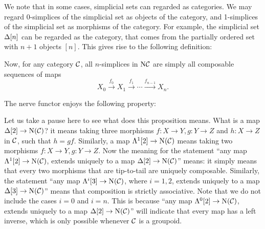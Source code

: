 We note that in some cases, simplicial sets can regarded as categories. We may regard 0-simplices of the simplicial set as objects of the category,
and 1-simplices of the simplicial set as morphisms of the category. For example, the simplicial set $\Delta[n]$ can be regarded as the category, 
that comes from the partially ordered set with $n+1$ objects $[n]$. This gives rise to the following definition:


Now, for any category $\mathcal{C}$, all $n$-simplices in $\mathrm{N}\mathcal{C}$ are simply all composable sequences of maps 
$$X_0\xrightarrow{f_0}X_1\xrightarrow{f_1}\cdots\xrightarrow{f_{n-1}}X_n.$$

The nerve functor enjoys the following property:


Let us take a pause here to see what does this proposition means. What is a map $\Delta[2]\to \mathrm{N}(\mathcal{C})$? it means taking three morphisms
$f:X\to Y,g:Y\to Z$ and $h:X\to Z$ in $\mathcal{C}$, such that $h=gf$. Similarly, a map $\Lambda^1[2]\to \mathrm{N}(\mathcal{C})$ means taking two morphisms 
$f:X\to Y,g:Y\to Z$. Now the meaning for the statement ``any map $\Lambda^1[2]\to \mathrm{N}(\mathcal{C})$, extends uniquely to a map $\Delta[2]\to \mathrm{N}(\mathcal{C})$'' means: 
it simply means that every two morphisms that are tip-to-tail are uniquely composable. Similarly, the statement ``any map $\Lambda^i[3]\to \mathrm{N}(\mathcal{C})$,
where $i=1,2$, extends uniquely to a map $\Delta[3]\to \mathrm{N}(\mathcal{C})$'' means that composition is strictly associative. Note that we do not
include the cases $i=0$ and $i=n$. This is because ``any map $\Lambda^0[2]\to \mathrm{N}(\mathcal{C})$, extends uniquely to a map $\Delta[2]\to \mathrm{N}(\mathcal{C})$''
will indicate that every map has a left inverse, which is only possible whenever $\mathcal{C}$ is a groupoid.

